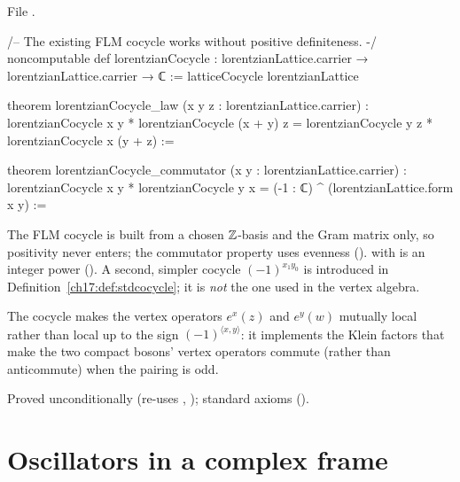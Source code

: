 \noindent File .
\begin{leancode}
/-- The existing FLM cocycle works without positive definiteness. -/
noncomputable def lorentzianCocycle :
    lorentzianLattice.carrier → lorentzianLattice.carrier → ℂ :=
  latticeCocycle lorentzianLattice

theorem lorentzianCocycle_law (x y z : lorentzianLattice.carrier) :
    lorentzianCocycle x y * lorentzianCocycle (x + y) z =
      lorentzianCocycle y z * lorentzianCocycle x (y + z) :=

theorem lorentzianCocycle_commutator (x y : lorentzianLattice.carrier) :
    lorentzianCocycle x y * lorentzianCocycle y x =
      (-1 : ℂ) ^ (lorentzianLattice.form x y) :=
\end{leancode}

\begin{dictionary}
The FLM cocycle is built from a chosen ${\mathbb{Z}}$-basis and the Gram matrix only, so positivity never enters;
the commutator property uses evenness ().   with 
is an integer power ().  A second, simpler cocycle $(-1)^{x_1y_0}$ is introduced in
Definition~\ref{ch17:def:stdcocycle}; it is \emph{not} the one used in the vertex algebra.
\end{dictionary}

\begin{physics}
The cocycle makes the vertex operators $e^x(z)$ and $e^y(w)$ mutually local rather than local up to the
sign $(-1)^{\langle x,y\rangle}$: it implements the Klein factors that make the two compact bosons' vertex
operators commute (rather than anticommute) when the pairing is odd.
\end{physics}

\begin{status}
Proved unconditionally (re-uses , ); standard
axioms ().
\end{status}

\section{Oscillators in a complex frame}\label{ch17:sec:frame}

